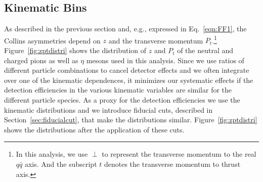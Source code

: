 \subsection{Kinematic Bins}
\label{sec:kinematicbins}
As described in the previous section and, e.g., expressed in Eq.~\eqref{eqn:FF1}, the Collins asymmetries depend on $z$ and the transverse momentum $P_t$.\footnote{In this analysis, we use $\perp$ to represent the transverse momentum to the real $q\bar{q}$ axis. And the subscript $t$ denotes the transverse momentum to thrust axis.}
Figure~\ref{fig:zptdistri} shows the distribution of $z$ and $P_t$ of the neutral and charged pions as well as $\eta$ mesons used in this analysis. Since we use ratios of different particle combinations to cancel detector effects and we often integrate over one of the kinematic dependences, it minimizes our systematic effects if the detection efficiencies in the various kinematic variables are similar for the different particle species. As a proxy for the detection efficiencies we use the kinematic distributions and we introduce fiducial cuts, described in Section~\ref{sec:fiducialcut}, that make the distributions similar. Figure~\ref{fig:zptdistri} shows the distributions after the application of these cuts.
